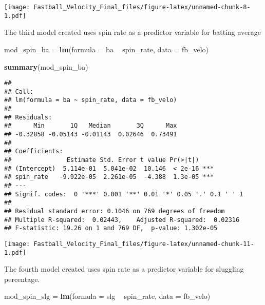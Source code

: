 \documentclass[]{article}
\newenvironment{Shaded}{\begin{snugshade}}{\end{snugshade}}
\newcommand{\KeywordTok}[1]{\textcolor[rgb]{0.13,0.29,0.53}{\textbf{#1}}}
\newcommand{\DataTypeTok}[1]{\textcolor[rgb]{0.13,0.29,0.53}{#1}}
\newcommand{\StringTok}[1]{\textcolor[rgb]{0.31,0.60,0.02}{#1}}
\newcommand{\OperatorTok}[1]{\textcolor[rgb]{0.81,0.36,0.00}{\textbf{#1}}}
\newcommand{\NormalTok}[1]{#1}
\begin{document}
\texttt{[image: Fastball\_Velocity\_Final\_files/figure-latex/unnamed-chunk-8-1.pdf]}

The third model created uses spin rate as a predictor variable for
batting average

\begin{Shaded}
\begin{Highlighting}[]
\NormalTok{mod_spin_ba =}\StringTok{ }\KeywordTok{lm}\NormalTok{(}\DataTypeTok{formula =}\NormalTok{ ba }\OperatorTok{~}\StringTok{ }\NormalTok{spin_rate, }\DataTypeTok{data =}\NormalTok{ fb_velo)}
\end{Highlighting}
\end{Shaded}

\begin{Shaded}
\begin{Highlighting}[]
\KeywordTok{summary}\NormalTok{(mod_spin_ba)}
\end{Highlighting}
\end{Shaded}

\begin{verbatim}
## 
## Call:
## lm(formula = ba ~ spin_rate, data = fb_velo)
## 
## Residuals:
##      Min       1Q   Median       3Q      Max 
## -0.32858 -0.05143 -0.01143  0.02646  0.73491 
## 
## Coefficients:
##               Estimate Std. Error t value Pr(>|t|)    
## (Intercept)  5.114e-01  5.041e-02  10.146  < 2e-16 ***
## spin_rate   -9.922e-05  2.261e-05  -4.388  1.3e-05 ***
## ---
## Signif. codes:  0 '***' 0.001 '**' 0.01 '*' 0.05 '.' 0.1 ' ' 1
## 
## Residual standard error: 0.1046 on 769 degrees of freedom
## Multiple R-squared:  0.02443,    Adjusted R-squared:  0.02316 
## F-statistic: 19.26 on 1 and 769 DF,  p-value: 1.302e-05
\end{verbatim}

\begin{Shaded}
\end{Shaded}

\texttt{[image: Fastball\_Velocity\_Final\_files/figure-latex/unnamed-chunk-11-1.pdf]}

The fourth model created uses spin rate as a predictor variable for
sluggling percentage.

\begin{Shaded}
\begin{Highlighting}[]
\NormalTok{mod_spin_slg =}\StringTok{ }\KeywordTok{lm}\NormalTok{(}\DataTypeTok{formula =}\NormalTok{ slg }\OperatorTok{~}\StringTok{ }\NormalTok{spin_rate, }\DataTypeTok{data =}\NormalTok{ fb_velo)}
\end{Highlighting}
\end{Shaded}
\end{document}
